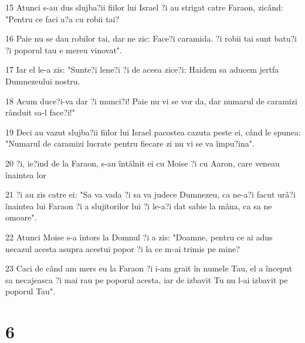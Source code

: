 \par 15 Atunci s-au dus slujba?ii fiilor lui Israel ?i au strigat catre Faraon, zicând: "Pentru ce faci a?a cu robii tai?
\par 16 Paie nu se dau robilor tai, dar ne zic: Face?i caramida. ?i robii tai sunt batu?i ?i poporul tau e mereu vinovat".
\par 17 Iar el le-a zis: "Sunte?i lene?i ?i de aceea zice?i: Haidem sa aducem jertfa Dumnezeului nostru.
\par 18 Acum duce?i-va dar ?i munci?i! Paie nu vi se vor da, dar numarul de caramizi rânduit sa-l face?i!"
\par 19 Deci au vazut slujba?ii fiilor lui Israel pacostea cazuta peste ei, când le spunea: "Numarul de caramizi lucrate pentru fiecare zi nu vi se va împu?ina".
\par 20 ?i, ie?ind de la Faraon, s-au întâlnit ei cu Moise ?i cu Aaron, care veneau înaintea lor
\par 21 ?i au zis catre ei: "Sa va vada ?i sa va judece Dumnezeu, ca ne-a?i facut urâ?i înaintea lui Faraon ?i a slujitorilor lui ?i le-a?i dat sabie la mâna, ca sa ne omoare".
\par 22 Atunci Moise s-a întors la Domnul ?i a zis: "Doamne, pentru ce ai adus necazul acesta asupra acestui popor ?i la ce m-ai trimis pe mine?
\par 23 Caci de când am mers eu la Faraon ?i i-am grait în numele Tau, el a început sa necajeasca ?i mai rau pe poporul acesta, iar de izbavit Tu nu l-ai izbavit pe poporul Tau".

\chapter{6}

